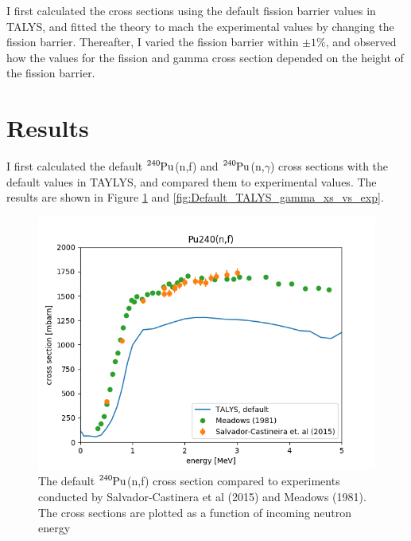 \documentclass[]{article}
\begin{document}
I first calculated the cross sections using the default fission barrier values in TALYS, and fitted the theory to mach the experimental values by changing the fission barrier. Thereafter, I varied the fission barrier within $\pm 1 \%$, and observed how the values for the fission and gamma cross section depended on the height of the fission barrier.

\section{Results}

I first calculated the default $\ce{^{240}Pu}$(n,f) and $\ce{^{240}Pu}$(n,$\gamma$) cross sections with the default values in TAYLYS, and compared them to experimental values. The results are shown in Figure \ref{fig:Default_TALYS_fission_xs_to_exp} and \ref{fig:Default_TALYS_gamma_xs_vs_exp}. 

  \begin{figure} [H]
	\centering
	\includegraphics[scale=0.7]{Default_TALYS_fission_xs_to_exp.png}
	\caption{The default $\ce{^{240}Pu}$(n,f) cross section compared to experiments conducted by Salvador-Castinera et al (2015) and Meadows (1981). The cross sections are plotted as a function of incoming neutron energy }
	\label{fig:Default_TALYS_fission_xs_to_exp}
\end{figure}
\end{document}
